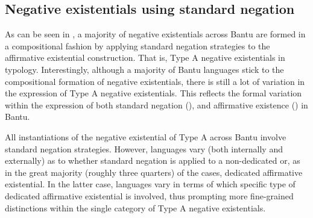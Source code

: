 \documentclass[output=paper]{langscibook}
\begin{document}
\subsection{Negative existentials using standard negation}\label{sec:1:5.1}
As can be seen in , a majority of negative 
existentials across Bantu are formed in a compositional fashion by applying 
standard negation strategies to the affirmative existential construction. That is, Type A negative existentials in  typology. Interestingly, although a majority of Bantu languages stick to the compositional formation of negative existentials, there is still a lot of variation in the expression of Type A negative existentials. This reflects the formal variation within the expression of both standard negation (), and affirmative existence () in Bantu.

All instantiations of the negative existential of Type A across Bantu involve standard negation strategies. However, languages vary (both internally and externally) as to whether standard negation is applied to a non-dedicated or, as in the great majority (roughly three quarters) of the cases, dedicated affirmative existential. In the latter case, languages vary in terms of which specific type of dedicated affirmative existential is involved, thus prompting more fine-grained distinctions within the single category of Type A negative existentials.
\end{document}
